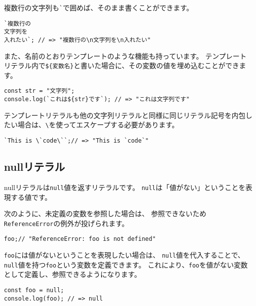 複数行の文字列も\lstinline{`}で囲めば、そのまま書くことができます。

\begin{lstlisting}
`複数行の
文字列を
入れたい`; // => "複数行の\n文字列を\n入れたい"
\end{lstlisting}

また、名前のとおりテンプレートのような機能も持っています。
テンプレートリテラル内で\texttt{\$\{変数名\}}と書いた場合に、その変数の値を埋め込むことができます。

\begin{lstlisting}
const str = "文字列";
console.log(`これは${str}です`); // => "これは文字列です"
\end{lstlisting}

テンプレートリテラルも他の文字列リテラルと同様に同じリテラル記号を内包したい場合は、\texttt{\textbackslash}を使ってエスケープする必要があります。

\begin{lstlisting}
`This is \`code\``;// => "This is `code`"
\end{lstlisting}

\hypertarget{null-literal}{%
\subsection{nullリテラル}\label{null-literal}}

nullリテラルは\texttt{null}値を返すリテラルです。
\texttt{null}は「値がない」ということを表現する値です。

次のように、未定義の変数を参照した場合は、
参照できないため\texttt{ReferenceError}の例外が投げられます。

\begin{lstlisting}
foo;// "ReferenceError: foo is not defined"
\end{lstlisting}

\texttt{foo}には値がないということを表現したい場合は、
\texttt{null}値を代入することで、\texttt{null}値を持つ\texttt{foo}という変数を定義できます。
これにより、\texttt{foo}を値がない変数として定義し、参照できるようになります。

\begin{lstlisting}
const foo = null;
console.log(foo); // => null
\end{lstlisting}

